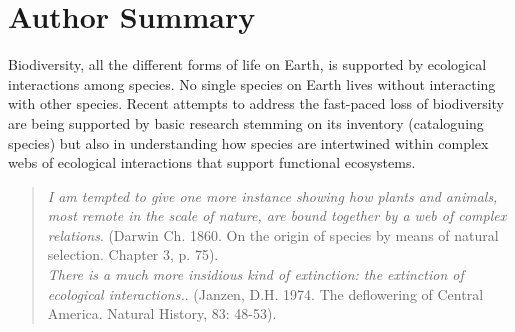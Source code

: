 \documentclass[10pt,letterpaper]{article}
\begin{document}
\section*{Author Summary}
Biodiversity, all the different forms of life on Earth, is supported by ecological interactions among species. No single species on Earth lives without interacting with other species. Recent attempts to address the fast-paced loss of biodiversity are being supported by basic research stemming on its inventory (cataloguing species) but also in understanding how species are intertwined within complex webs of ecological interactions that support functional ecosystems.\\
\bigskip
\linenumbers

\begin{quotation}
  \textit{I am tempted to give one more instance showing how plants and animals, most remote in the scale of nature, are bound together by a web of complex relations}. (Darwin Ch. 1860. On the origin of species by means of natural selection. Chapter 3, p. 75).\\
  \textit{There is a much more insidious kind of extinction: the extinction of ecological interactions.}. (Janzen, D.H. 1974. The deflowering of Central America. Natural History, 83: 48-53).\\
\bigskip
\end{quotation}
\end{document}
